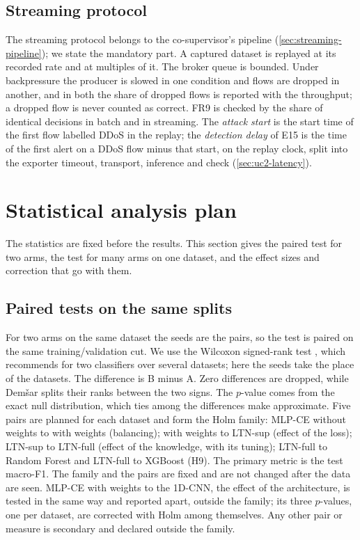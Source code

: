 \subsection{Streaming protocol}
\label{sec:streaming-protocol}

The streaming protocol belongs to the co-supervisor's pipeline (\cref{sec:streaming-pipeline});
we state the mandatory part. A captured dataset is replayed at its recorded rate and at
multiples of it. The broker queue is bounded. Under backpressure the producer is slowed in
one condition and flows are dropped in another, and in both the share of dropped flows is
reported with the throughput; a dropped flow is never counted as correct. FR9 is checked by
the share of identical decisions in batch and in streaming. The \emph{attack start} is the
start time of the first flow labelled DDoS in the replay; the \emph{detection delay} of E15 is
the time of the first alert on a DDoS flow minus that start, on the replay clock, split into
the exporter timeout, transport, inference and check (\cref{sec:uc2-latency}).

\section{Statistical analysis plan}
\label{sec:statistical-plan}

The statistics are fixed before the results. This section gives the paired test for two
arms, the test for many arms on one dataset, and the effect sizes and correction that go with
them.

\subsection{Paired tests on the same splits}
\label{sec:wilcoxon}

For two arms on the same dataset the seeds are the pairs, so the test is paired on the
same training/validation cut. We use the Wilcoxon signed-rank test \citep{wilcoxon1945individual},
which \citet{demsar2006statistical} recommends for two classifiers over several datasets;
here the seeds take the place of the datasets. The difference is B minus A. Zero differences
are dropped, while Dem{\v{s}}ar splits their ranks between the two signs. The $p$-value comes
from the exact null distribution, which ties among the differences make approximate. Five
pairs are planned for each dataset and form the Holm family: MLP-CE without weights to with
weights (balancing); with weights to LTN-sup (effect of the loss); LTN-sup to LTN-full (effect
of the knowledge, with its tuning); LTN-full to Random Forest and LTN-full to XGBoost (H9). The primary metric
is the test macro-F1. The family and the pairs
are fixed and are not changed after the data are seen. MLP-CE with weights to the 1D-CNN, the
effect of the architecture, is tested in the same way and reported apart, outside the family; its
three $p$-values, one per dataset, are corrected with Holm among themselves. Any other pair or measure is secondary and declared outside the
family.


